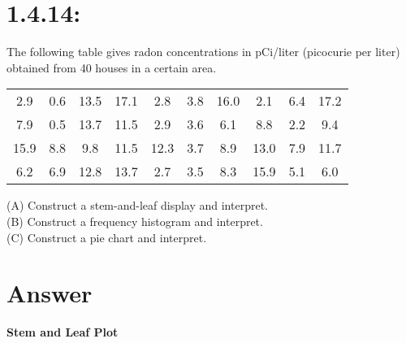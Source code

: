\documentclass{article}
\begin{document}
\newpage

\section{{\huge 1.4.14:}}

The following table gives radon concentrations in pCi/liter (picocurie per liter) obtained from 40 houses in a
certain area.

\begin{center}
    \begin{tabular}{c|c|c|c|c|c|c|c|c|c}
        2.9 & 0.6 & 13.5 & 17.1 & 2.8 & 3.8 & 16.0 & 2.1 & 6.4 & 17.2 \\
        7.9 & 0.5 & 13.7 & 11.5 & 2.9 & 3.6 & 6.1 & 8.8 & 2.2 & 9.4 \\
        15.9 & 8.8 & 9.8 & 11.5 & 12.3 & 3.7 & 8.9 & 13.0 & 7.9 & 11.7 \\
        6.2 & 6.9 & 12.8 & 13.7 & 2.7 & 3.5 & 8.3 & 15.9 & 5.1 & 6.0 \\ 
    \end{tabular} 
\end{center}

\smallskip
\smallskip 

\textsc{(A)} Construct a stem-and-leaf display and interpret.\\
\textsc{(B)} Construct a frequency histogram and interpret.\\
\textsc{(C)} Construct a pie chart and interpret.

\newpage

\section*{Answer}

\textbf{Stem and Leaf Plot}\\
\end{document}
